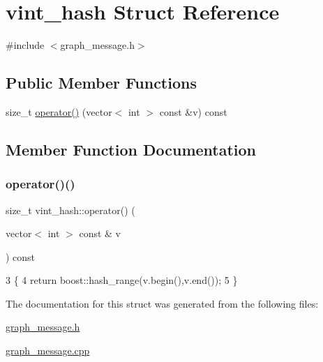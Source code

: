 \hypertarget{structvint__hash}{}\section{vint\+\_\+hash Struct Reference}
\label{structvint__hash}


{\ttfamily \#include $<$graph\+\_\+message.\+h$>$}

\subsection*{Public Member Functions}
\begin{DoxyCompactItemize}
\item 
size\+\_\+t \hyperlink{structvint__hash_a4cbe939bbbf51cf2e77c688ce6f1bf78}{operator()} (vector$<$ int $>$ const \&v) const
\end{DoxyCompactItemize}


\subsection{Member Function Documentation}
\mbox{\label{structvint__hash_a4cbe939bbbf51cf2e77c688ce6f1bf78}} 
\subsubsection{\texorpdfstring{operator()()}{operator()()}}
{\footnotesize\ttfamily size\+\_\+t vint\+\_\+hash\+::operator() (\begin{DoxyParamCaption}\item[{vector$<$ int $>$ const \&}]{v }\end{DoxyParamCaption}) const}


\begin{DoxyCode}
3                                                       \{
4   \textcolor{keywordflow}{return} boost::hash\_range(v.begin(),v.end());
5 \}
\end{DoxyCode}


The documentation for this struct was generated from the following files\+:\begin{DoxyCompactItemize}
\item 
\hyperlink{graph__message_8h}{graph\+\_\+message.\+h}\item 
\hyperlink{graph__message_8cpp}{graph\+\_\+message.\+cpp}\end{DoxyCompactItemize}
